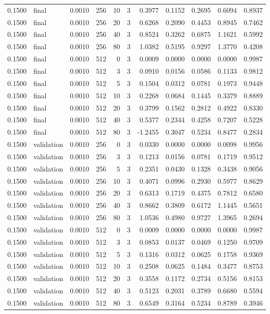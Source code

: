 \begin{tabular}{rlrrrrrrrrr}
0.1500 & final & 0.0010 & 256 & 10 & 3 & 0.3977 & 0.1152 & 0.2695 & 0.6094 & 0.8937 \\
0.1500 & final & 0.0010 & 256 & 20 & 3 & 0.6268 & 0.2090 & 0.4453 & 0.8945 & 0.7462 \\
0.1500 & final & 0.0010 & 256 & 40 & 3 & 0.8524 & 0.3262 & 0.6875 & 1.1621 & 0.5992 \\
0.1500 & final & 0.0010 & 256 & 80 & 3 & 1.0382 & 0.5195 & 0.9297 & 1.3770 & 0.4208 \\
0.1500 & final & 0.0010 & 512 & 0 & 3 & 0.0009 & 0.0000 & 0.0000 & 0.0000 & 0.9987 \\
0.1500 & final & 0.0010 & 512 & 3 & 3 & 0.0910 & 0.0156 & 0.0586 & 0.1133 & 0.9812 \\
0.1500 & final & 0.0010 & 512 & 5 & 3 & 0.1504 & 0.0312 & 0.0781 & 0.1973 & 0.9448 \\
0.1500 & final & 0.0010 & 512 & 10 & 3 & 0.2268 & 0.0684 & 0.1445 & 0.3379 & 0.8889 \\
0.1500 & final & 0.0010 & 512 & 20 & 3 & 0.3799 & 0.1562 & 0.2812 & 0.4922 & 0.8330 \\
0.1500 & final & 0.0010 & 512 & 40 & 3 & 0.5377 & 0.2344 & 0.4258 & 0.7207 & 0.5228 \\
0.1500 & final & 0.0010 & 512 & 80 & 3 & -1.2455 & 0.3047 & 0.5234 & 0.8477 & 0.2834 \\
0.1500 & validation & 0.0010 & 256 & 0 & 3 & 0.0330 & 0.0000 & 0.0000 & 0.0098 & 0.9956 \\
0.1500 & validation & 0.0010 & 256 & 3 & 3 & 0.1213 & 0.0156 & 0.0781 & 0.1719 & 0.9512 \\
0.1500 & validation & 0.0010 & 256 & 5 & 3 & 0.2351 & 0.0430 & 0.1328 & 0.3438 & 0.9056 \\
0.1500 & validation & 0.0010 & 256 & 10 & 3 & 0.4071 & 0.0996 & 0.2930 & 0.5977 & 0.8629 \\
0.1500 & validation & 0.0010 & 256 & 20 & 3 & 0.6313 & 0.1719 & 0.4375 & 0.7812 & 0.6580 \\
0.1500 & validation & 0.0010 & 256 & 40 & 3 & 0.8662 & 0.3809 & 0.6172 & 1.1445 & 0.5651 \\
0.1500 & validation & 0.0010 & 256 & 80 & 3 & 1.0536 & 0.4980 & 0.9727 & 1.3965 & 0.2694 \\
0.1500 & validation & 0.0010 & 512 & 0 & 3 & 0.0009 & 0.0000 & 0.0000 & 0.0000 & 0.9987 \\
0.1500 & validation & 0.0010 & 512 & 3 & 3 & 0.0853 & 0.0137 & 0.0469 & 0.1250 & 0.9709 \\
0.1500 & validation & 0.0010 & 512 & 5 & 3 & 0.1316 & 0.0312 & 0.0625 & 0.1758 & 0.9369 \\
0.1500 & validation & 0.0010 & 512 & 10 & 3 & 0.2508 & 0.0625 & 0.1484 & 0.3477 & 0.8753 \\
0.1500 & validation & 0.0010 & 512 & 20 & 3 & 0.3558 & 0.1172 & 0.2734 & 0.5156 & 0.8153 \\
0.1500 & validation & 0.0010 & 512 & 40 & 3 & 0.5123 & 0.2031 & 0.3789 & 0.6680 & 0.5594 \\
0.1500 & validation & 0.0010 & 512 & 80 & 3 & 0.6549 & 0.3164 & 0.5234 & 0.8789 & 0.3946 \\
\bottomrule
\end{tabular}
